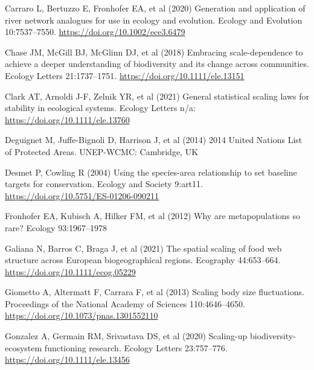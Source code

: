 \documentclass[
  12pt,
]{article}
\newlength{\cslhangindent}
\newlength{\cslentryspacingunit} %
\newenvironment{CSLReferences}[2] %
 {%
  \setlength{\parindent}{0pt}
  \ifodd #1
  \let\oldpar\par
  \def\par{\hangindent=\cslhangindent\oldpar}
  \fi
  \setlength{\parskip}{#2\cslentryspacingunit}
 }%
 {}
\begin{document}
\begin{CSLReferences}{1}{0}
\leavevmode{}%
Carraro L, Bertuzzo E, Fronhofer EA, et al (2020) Generation and application of river network analogues for use in ecology and evolution. Ecology and Evolution 10:7537--7550. \url{https://doi.org/10.1002/ece3.6479}

\leavevmode{}%
Chase JM, McGill BJ, McGlinn DJ, et al (2018) Embracing scale-dependence to achieve a deeper understanding of biodiversity and its change across communities. Ecology Letters 21:1737--1751. \url{https://doi.org/10.1111/ele.13151}

\leavevmode{}%
Clark AT, Arnoldi J-F, Zelnik YR, et al (2021) General statistical scaling laws for stability in ecological systems. Ecology Letters n/a: \url{https://doi.org/10.1111/ele.13760}

\leavevmode{}%
Deguignet M, Juffe-Bignoli D, Harrison J, et al (2014) 2014 {United Nations List} of {Protected Areas}. UNEP-WCMC: Cambridge, UK

\leavevmode{}%
Desmet P, Cowling R (2004) Using the species-area relationship to set baseline targets for conservation. Ecology and Society 9:art11. \url{https://doi.org/10.5751/ES-01206-090211}

\leavevmode{}%
Fronhofer EA, Kubisch A, Hilker FM, et al (2012) Why are metapopulations so rare? Ecology 93:1967--1978

\leavevmode{}%
Galiana N, Barros C, Braga J, et al (2021) The spatial scaling of food web structure across {European} biogeographical regions. Ecography 44:653--664. \url{https://doi.org/10.1111/ecog.05229}

\leavevmode{}%
Giometto A, Altermatt F, Carrara F, et al (2013) Scaling body size fluctuations. Proceedings of the National Academy of Sciences 110:4646--4650. \url{https://doi.org/10.1073/pnas.1301552110}

\leavevmode{}%
Gonzalez A, Germain RM, Srivastava DS, et al (2020) Scaling-up biodiversity-ecosystem functioning research. Ecology Letters 23:757--776. \url{https://doi.org/10.1111/ele.13456}


\end{CSLReferences}
\end{document}

